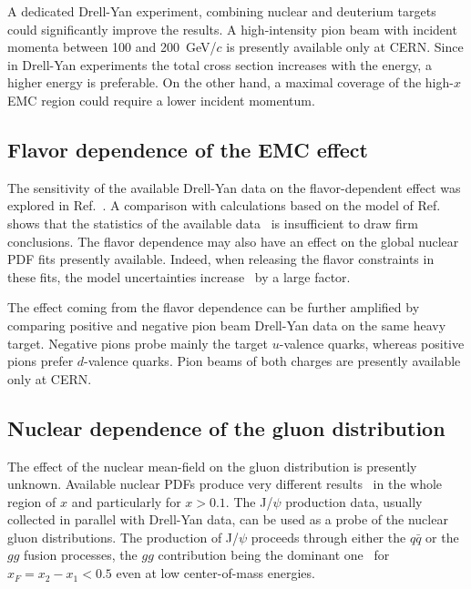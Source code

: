 A dedicated Drell-Yan experiment, 
combining nuclear and deuterium targets could significantly improve the results. 
A high-intensity pion beam with incident momenta between 100 and 200~GeV/$c$ is presently available 
only at CERN. Since in Drell-Yan experiments the total cross section increases with the energy, a higher 
energy is preferable. On the other hand, a maximal coverage of the high-$x$ EMC region could require a 
lower incident momentum.  

\subsection{Flavor dependence of the EMC effect} 

The sensitivity of the available Drell-Yan data on the flavor-dependent effect was explored in 
Ref.~\cite{Dutta:2010pg}. A comparison with calculations based on the model of Ref.~\cite{Cloet:2009qs} 
shows that the  statistics of the available data~\cite{Badier:1981ci,Bordalo:1987cs} is insufficient to draw firm conclusions. 
The flavor dependence may also have an effect 
on the global nuclear PDF fits presently available. Indeed, when releasing the flavor constraints in these fits, 
the model uncertainties increase~\cite{Paakkinen:2016wxk} by a large factor. 

The effect coming from the flavor dependence can be further amplified by 
comparing positive and negative pion beam Drell-Yan data on the same heavy target. Negative pions probe mainly the 
target $u$-valence quarks, whereas positive pions prefer $d$-valence quarks. Pion beams of both charges
are presently available only at CERN. 

\subsection{Nuclear dependence of the gluon distribution}
%
The effect of the nuclear mean-field on the gluon distribution is presently unknown. Available nuclear PDFs produce very different results~\cite{Cazaroto:2008qh} in the whole region of $x$ and particularly for $x > 0.1$. The J/$\psi$ production data,  usually collected in parallel with Drell-Yan data, can be used as a probe of the nuclear gluon distributions.  The production of J/$\psi$ proceeds through either the $q\bar q$ or the $gg$ fusion processes, the $gg$  contribution being the dominant one~\cite{Vogt:1999dw} for $x_F = x_2 - x_1 < 0.5$  even at low center-of-mass energies. 

